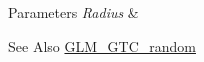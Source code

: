 \begin{DoxyParams}{Parameters}
{\em Radius} & \\
\hline
\end{DoxyParams}
\begin{DoxySeeAlso}{See Also}
\hyperlink{group__gtc__random}{G\-L\-M\-\_\-\-G\-T\-C\-\_\-random} 
\end{DoxySeeAlso}
